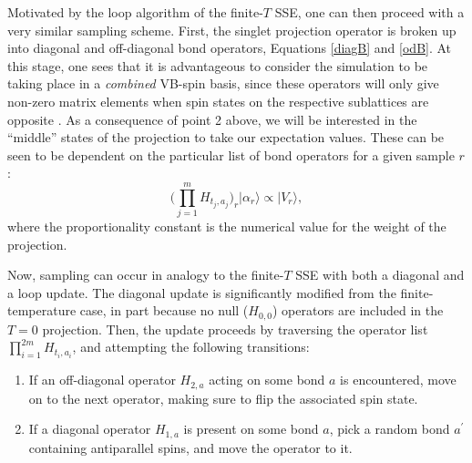 \documentclass[vecphys]{svmult}
\begin{document}
Motivated by the loop algorithm of the finite-$T$ SSE, one can then proceed with a very similar sampling scheme.  First, the singlet projection operator is broken up into diagonal and off-diagonal bond operators, Equations \ref{diagB} and \ref{odB}.
At this stage, one sees that it is advantageous to consider the simulation to be taking place in a {\em combined} VB-spin basis, since these operators will only give non-zero matrix elements when spin states on the respective sublattices are opposite \cite{Melko:Sandvik10a}.  
As a consequence of point 2 above, we will be interested in the ``middle'' states of the projection to take our expectation values.  
These can be seen to be dependent on the particular list of bond operators for a given sample $r$: 
\begin{equation}
\big( \prod_{j=1}^{m} {H_{t_j,a_j}} \big)_r | \alpha_r \rangle \propto |V_r \rangle, \label{midV}
\end{equation}
where the proportionality constant is the numerical value for the weight of the projection.

Now, sampling can occur in analogy to the finite-$T$ SSE with both a diagonal and a loop update.
The diagonal update is significantly modified from the finite-temperature case, in part because no null ($H_{0,0}$) operators are included in the $T=0$ projection.  Then, the update proceeds by traversing the operator list $\prod_{i=1}^{2m} {H_{t_i,a_i}}$, and attempting the following transitions:
\begin{enumerate}
\item If an off-diagonal operator $H_{2,a}$ acting on some bond $a$ is encountered, move on to the next operator, making sure to flip the associated spin state.
\item If a diagonal operator $H_{1,a}$ is present on some bond $a$, pick a random bond $a^\prime$ containing antiparallel spins, and move the operator to it.
\end{enumerate}
\end{document}
